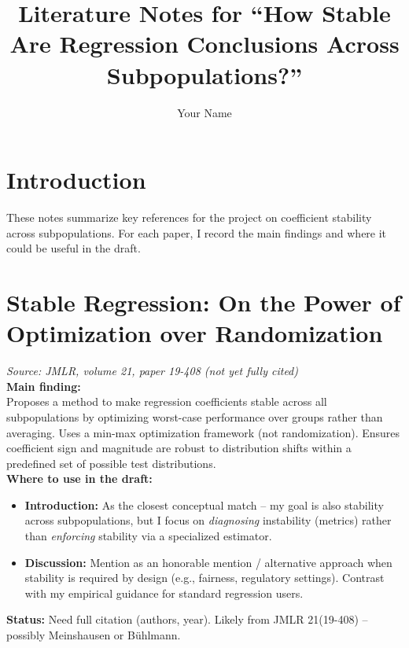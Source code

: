 \documentclass[11pt]{article}
\title{Literature Notes for ``How Stable Are Regression Conclusions Across Subpopulations?''}
\author{Your Name}
\date{}
\begin{document}
\maketitle

\section*{Introduction}
These notes summarize key references for the project on coefficient stability across subpopulations. For each paper, I record the main findings and where it could be useful in the draft.

\section{Stable Regression: On the Power of Optimization over Randomization}
\textit{Source: JMLR, volume 21, paper 19-408 (not yet fully cited)} \\
\textbf{Main finding:} \\
Proposes a method to make regression coefficients stable across all subpopulations by optimizing worst-case performance over groups rather than averaging. Uses a min-max optimization framework (not randomization). Ensures coefficient sign and magnitude are robust to distribution shifts within a predefined set of possible test distributions. \\
\textbf{Where to use in the draft:}
\begin{itemize}
    \item \textbf{Introduction:} As the closest conceptual match – my goal is also stability across subpopulations, but I focus on \emph{diagnosing} instability (metrics) rather than \emph{enforcing} stability via a specialized estimator.
    \item \textbf{Discussion:} Mention as an honorable mention / alternative approach when stability is required by design (e.g., fairness, regulatory settings). Contrast with my empirical guidance for standard regression users.
\end{itemize}
\textbf{Status:} Need full citation (authors, year). Likely from JMLR 21(19-408) – possibly Meinshausen or Bühlmann.
\end{document}

